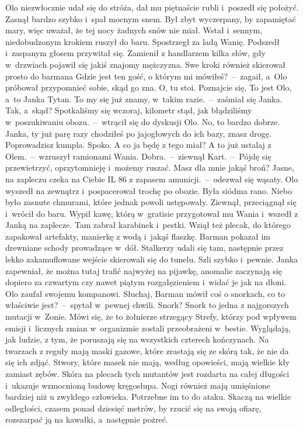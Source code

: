 \documentclass[../MAIN.tex]{subfiles}
\begin{document}
Olo niezwłocznie udał się do stróża, dał mu piętnaście rubli i~poszedł się położyć. Zasnął bardzo szybko i~spał mocnym snem. Był zbyt wyczerpany, by zapamiętać mary, więc uważał, że tej nocy żadnych snów nie miał.
Wstał i~sennym, niedobudzonym krokiem ruszył do baru. Spostrzegł za ladą Wanię. Podszedł i~zaspanym głosem przywitał się. Zamienił z handlarzem kilka słów, gdy w~drzwiach pojawił się jakiś znajomy mężczyzna. Swe kroki również skierował prosto do barmana
\sx Gdzie jest ten gość, o którym mi mówiłeś?~--~zagaił, a~Olo próbował przypomnieć sobie, skąd go zna.
\xx O, tu stoi. Poznajcie się, To jest Olo, a~to Janka Tytan.
\xx To my się już znamy, w~takim razie.~--~zaśmiał się Janka.
\xx Tak, a~skąd?
\xx Spotkaliśmy się wczoraj, kilometr stąd, jak błądziliśmy w~poszukiwaniu obozu.~--~wtrącił się do dyskusji Olo.
\xx No, to bardzo dobrze. Janka, ty już parę razy chodziłeś po jajogłowych do ich bazy, znasz drogę. Poprowadzisz kumpla.
\xx Spoko. A co ja będę z tego miał?
\xx A to już ustalaj z Olem.~--~wzruszył ramionami Wania.
\xx Dobra.~--~ziewnął Kart.~--~Pójdę się przewietrzyć, oprzytomnieję i~możemy ruszać. Masz dla mnie jakąś broń?
\xx Jasne, na zapleczu czeka na Ciebie IL 86 z zapasem amunicji.~--~odezwał się wąsaty.
\qm
Olo wyszedł na zewnątrz i~pospacerował trochę po obozie. Była siódma rano. Niebo było zasnute chmurami, które jednak powoli ustępowały. Ziewnął, przeciągnął się i~wrócił do baru. Wypił kawę, którą w~gratisie przygotował mu Wania i~wszedł z Janką na zaplecze. Tam zabrał karabinek i~pestki. Wziął też plecak, do którego zapakował artefakty, manierkę z wodą i~jakąś flaszkę. Barman pokazał im drewniane schody prowadzące w~dół. Stalkerzy udali się tam, następnie przez lekko zakamuflowane wejście skierowali się do tunelu. Szli szybko i~pewnie. Janka zapewniał, że można tutaj trafić najwyżej na pijawkę, anomalie zaczynają się dopiero za czwartym czy nawet piątym rozgałęzieniem i~widać je jak na dłoni. Olo zaufał swojemu kompanowi.
\sx Słuchaj, Barman mówił coś o snorkach, co to właściwie jest?~--~spytał w~pewnej chwili.
\xx Snork? Snork to jedna z najgorszych mutacji w~Zonie. Mówi się, że to żołnierze strzegący Strefy, którzy pod wpływem emisji i~licznych zmian w~organizmie zostali przeobrażeni w~bestie. Wyglądają, jak ludzie, z tym, że poruszają się na wszystkich czterech kończynach. Na twarzach z reguły mają maski gazowe, które zrastają się ze skórą tak, że nie da się ich zdjąć. Stwory, które masek nie mają, według opowieści, mają wielkie kły zamiast zębów. Skóra na plecach tych mutantów jest rozdarta na całej długości i~ukazuje wzmocnioną budowę kręgosłupa. Nogi również mają umięśnione bardziej niż u zwykłego człowieka. Potrzebne im to do ataku. Skaczą na wielkie odległości, czasem ponad dziesięć metrów, by rzucić się na swoją ofiarę, rozszarpać ją na kawałki, a~następnie pożreć.
\end{document}
